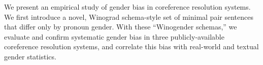 We present an empirical study of gender bias in coreference resolution systems. We first introduce a novel, Winograd schema-style set of minimal pair sentences that differ only by pronoun gender. With these ``Winogender schemas,'' we evaluate and confirm systematic gender bias in three publicly-available coreference resolution systems, and correlate this bias with real-world and textual gender statistics.
